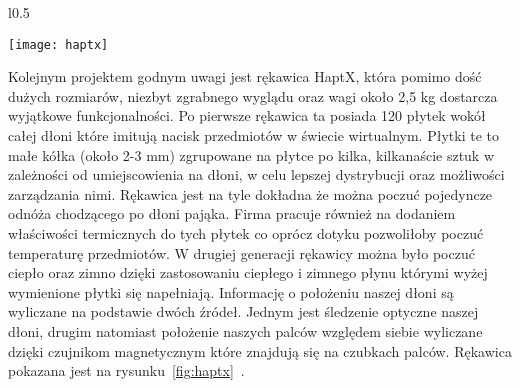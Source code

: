 		\begin{wrapfigure}{l}{0.5\textwidth}
\begin{center}
\texttt{[image: haptx]}
\label{fig:haptx}
\end{center}
\end{wrapfigure}
	 Kolejnym projektem godnym uwagi jest rękawica HaptX, która pomimo dość dużych rozmiarów, niezbyt zgrabnego wyglądu oraz wagi około 2,5 kg dostarcza wyjątkowe funkcjonalności. Po pierwsze rękawica ta posiada 120 płytek wokół całej dłoni które imitują nacisk przedmiotów w świecie wirtualnym. Płytki te to małe kółka (około 2-3 mm) zgrupowane na płytce po kilka, kilkanaście sztuk w zależności od umiejscowienia na dłoni, w celu lepszej dystrybucji oraz możliwości zarządzania nimi. Rękawica jest na tyle dokładna że można poczuć pojedyncze odnóża chodzącego po dłoni pająka. Firma pracuje również na dodaniem właściwości termicznych do tych płytek co oprócz dotyku pozwoliłoby poczuć temperaturę przedmiotów. W drugiej generacji rękawicy można było poczuć ciepło oraz zimno dzięki zastosowaniu ciepłego i zimnego płynu którymi wyżej wymienione płytki się napełniają. Informację o położeniu naszej dłoni są wyliczane na podstawie dwóch źródeł. Jednym jest śledzenie optyczne naszej dłoni, drugim natomiast położenie naszych palców względem siebie wyliczane dzięki czujnikom magnetycznym które znajdują się na czubkach palców. Rękawica pokazana jest na rysunku~\ref{fig:haptx}~\cite{haptx}.
